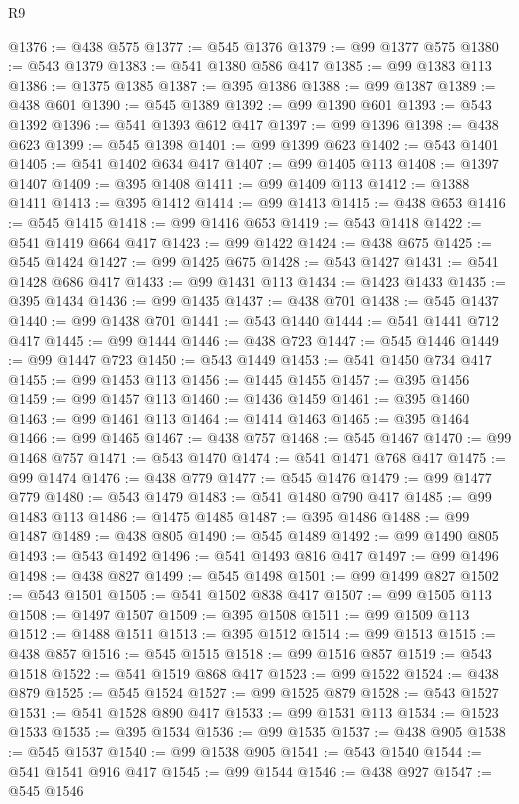 \begin{lexlean}{R9}
\begin{coremodule}
{{{{{{{{{{{{{{{{{{{{{{{{{{{{{{{{{{{{{{{{{{{{{{{{{{{{{{{{{{{{{{{{{{{{{{{{{{{{{{{{{{{{@1376 := @438 @575
@1377 := @545 @1376
@1379 := @99 @1377 @575
@1380 := @543 @1379
@1383 := @541 @1380 @586 @417
@1385 := @99 @1383 @113
@1386 := @1375 @1385
@1387 := @395 @1386
@1388 := @99 @1387
@1389 := @438 @601
@1390 := @545 @1389
@1392 := @99 @1390 @601
@1393 := @543 @1392
@1396 := @541 @1393 @612 @417
@1397 := @99 @1396
@1398 := @438 @623
@1399 := @545 @1398
@1401 := @99 @1399 @623
@1402 := @543 @1401
@1405 := @541 @1402 @634 @417
@1407 := @99 @1405 @113
@1408 := @1397 @1407
@1409 := @395 @1408
@1411 := @99 @1409 @113
@1412 := @1388 @1411
@1413 := @395 @1412
@1414 := @99 @1413
@1415 := @438 @653
@1416 := @545 @1415
@1418 := @99 @1416 @653
@1419 := @543 @1418
@1422 := @541 @1419 @664 @417
@1423 := @99 @1422
@1424 := @438 @675
@1425 := @545 @1424
@1427 := @99 @1425 @675
@1428 := @543 @1427
@1431 := @541 @1428 @686 @417
@1433 := @99 @1431 @113
@1434 := @1423 @1433
@1435 := @395 @1434
@1436 := @99 @1435
@1437 := @438 @701
@1438 := @545 @1437
@1440 := @99 @1438 @701
@1441 := @543 @1440
@1444 := @541 @1441 @712 @417
@1445 := @99 @1444
@1446 := @438 @723
@1447 := @545 @1446
@1449 := @99 @1447 @723
@1450 := @543 @1449
@1453 := @541 @1450 @734 @417
@1455 := @99 @1453 @113
@1456 := @1445 @1455
@1457 := @395 @1456
@1459 := @99 @1457 @113
@1460 := @1436 @1459
@1461 := @395 @1460
@1463 := @99 @1461 @113
@1464 := @1414 @1463
@1465 := @395 @1464
@1466 := @99 @1465
@1467 := @438 @757
@1468 := @545 @1467
@1470 := @99 @1468 @757
@1471 := @543 @1470
@1474 := @541 @1471 @768 @417
@1475 := @99 @1474
@1476 := @438 @779
@1477 := @545 @1476
@1479 := @99 @1477 @779
@1480 := @543 @1479
@1483 := @541 @1480 @790 @417
@1485 := @99 @1483 @113
@1486 := @1475 @1485
@1487 := @395 @1486
@1488 := @99 @1487
@1489 := @438 @805
@1490 := @545 @1489
@1492 := @99 @1490 @805
@1493 := @543 @1492
@1496 := @541 @1493 @816 @417
@1497 := @99 @1496
@1498 := @438 @827
@1499 := @545 @1498
@1501 := @99 @1499 @827
@1502 := @543 @1501
@1505 := @541 @1502 @838 @417
@1507 := @99 @1505 @113
@1508 := @1497 @1507
@1509 := @395 @1508
@1511 := @99 @1509 @113
@1512 := @1488 @1511
@1513 := @395 @1512
@1514 := @99 @1513
@1515 := @438 @857
@1516 := @545 @1515
@1518 := @99 @1516 @857
@1519 := @543 @1518
@1522 := @541 @1519 @868 @417
@1523 := @99 @1522
@1524 := @438 @879
@1525 := @545 @1524
@1527 := @99 @1525 @879
@1528 := @543 @1527
@1531 := @541 @1528 @890 @417
@1533 := @99 @1531 @113
@1534 := @1523 @1533
@1535 := @395 @1534
@1536 := @99 @1535
@1537 := @438 @905
@1538 := @545 @1537
@1540 := @99 @1538 @905
@1541 := @543 @1540
@1544 := @541 @1541 @916 @417
@1545 := @99 @1544
@1546 := @438 @927
@1547 := @545 @1546
}}}}}}}}}}}}}}}}}}}}}}}}}}}}}}}}}}}}}}}}}}}}}}}}}}}}}}}}}}}}}}}}}}}}}}}}}}}}}}}}}}}}
\end{coremodule}
\end{lexlean}
